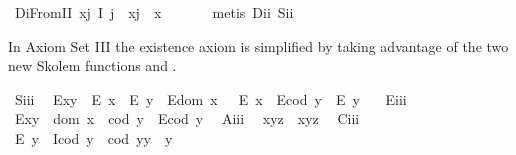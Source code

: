 \begin{isabellebody}
\ D\isactrlsub iFromII{\isacharcolon}\ {\isachardoublequoteopen}\isactrlbold {\isasymforall}x{\isachardot}\isactrlbold {\isasymexists}j{\isachardot}\ I\ j\ \isactrlbold {\isasymand}\ x{\isasymcdot}j\ {\isasymcong}\ x{\isachardoublequoteclose}\ \isanewline
%
\isadelimproof
\ \ \ \ %
\endisadelimproof
%
\isatagproof
{}\isamarkupfalse%
\ {\isacharparenleft}metis\ D\isactrlsub i\isactrlsub i\ S\isactrlsub i\isactrlsub i{\isacharparenright}%
\endisatagproof
{\isafoldproof}%
%
\isadelimproof
%
\endisadelimproof
%
\isamarkuptrue%
%
\begin{isamarkuptext}%
In Axiom Set III the existence  axiom   is simplified by taking advantage of 
  the two new Skolem functions  and .%
\end{isamarkuptext}\isamarkuptrue%
\ S\isactrlsub i\isactrlsub i\isactrlsub i{\isacharcolon}\ %
\ {\isachardoublequoteopen}{\isacharparenleft}E{\isacharparenleft}x{\isasymcdot}y{\isacharparenright}\ \isactrlbold {\isasymrightarrow}\ {\isacharparenleft}E\ x\ \isactrlbold {\isasymand}\ E\ y{\isacharparenright}{\isacharparenright}\ \isactrlbold {\isasymand}\ {\isacharparenleft}E{\isacharparenleft}dom\ x\ {\isacharparenright}\ \isactrlbold {\isasymrightarrow}\ E\ x{\isacharparenright}\ \isactrlbold {\isasymand}\ {\isacharparenleft}E{\isacharparenleft}cod\ y{\isacharparenright}\ \isactrlbold {\isasymrightarrow}\ E\ y{\isacharparenright}{\isachardoublequoteclose}\ \ \isanewline
\ E\isactrlsub i\isactrlsub i\isactrlsub i{\isacharcolon}\ %
\ {\isachardoublequoteopen}E{\isacharparenleft}x{\isasymcdot}y{\isacharparenright}\ \isactrlbold {\isasymleftarrow}\ {\isacharparenleft}dom\ x\ {\isasymcong}\ cod\ y\ \isactrlbold {\isasymand}\ E{\isacharparenleft}cod\ y{\isacharparenright}{\isacharparenright}{\isachardoublequoteclose}\ \isanewline
\ A\isactrlsub i\isactrlsub i\isactrlsub i{\isacharcolon}\ %
\ {\isachardoublequoteopen}x{\isasymcdot}{\isacharparenleft}y{\isasymcdot}z{\isacharparenright}\ {\isasymcong}\ {\isacharparenleft}x{\isasymcdot}y{\isacharparenright}{\isasymcdot}z{\isachardoublequoteclose}\ \isanewline
\ C\isactrlsub i\isactrlsub i\isactrlsub i{\isacharcolon}\ %
\ {\isachardoublequoteopen}E\ y\ \isactrlbold {\isasymrightarrow}\ {\isacharparenleft}I{\isacharparenleft}cod\ y{\isacharparenright}\ \isactrlbold {\isasymand}\ {\isacharparenleft}cod\ y{\isacharparenright}{\isasymcdot}y\ {\isasymcong}\ y{\isacharparenright}{\isachardoublequoteclose}\ \isanewline

\end{isabellebody}
